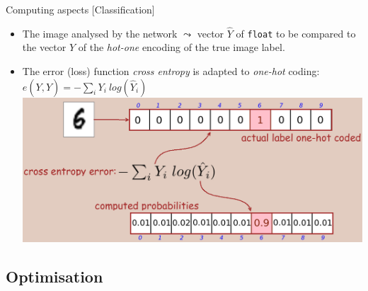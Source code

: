 \documentclass[10pt,serif,mathserif,compress,hyperref={colorlinks}]{beamer}
\begin{document}
\begin{frame}{Computing aspects [Classification]}

\begin{tcolorbox}[title=Error function: {\em Cross entropy error}]

  \begin{itemize}
  \item The image analysed by the network $\leadsto$ vector $\hat{Y}$ of \texttt{float} to be compared to the vector $Y$ of the {\em hot-one} encoding of the true image label.
  \item The error (loss) function {\em cross entropy} is adapted to {\em one-hot} coding: $e(Y,\hat{Y})=-\sum_i Y_i\ log(\hat {Y}_i)$\\
    \includegraphics[width=.9\textwidth]{images/CrossEntropyError.png}
  \end{itemize}
  
   \end{tcolorbox}  
\end{frame}

\subsection{Optimisation}
\end{document}
